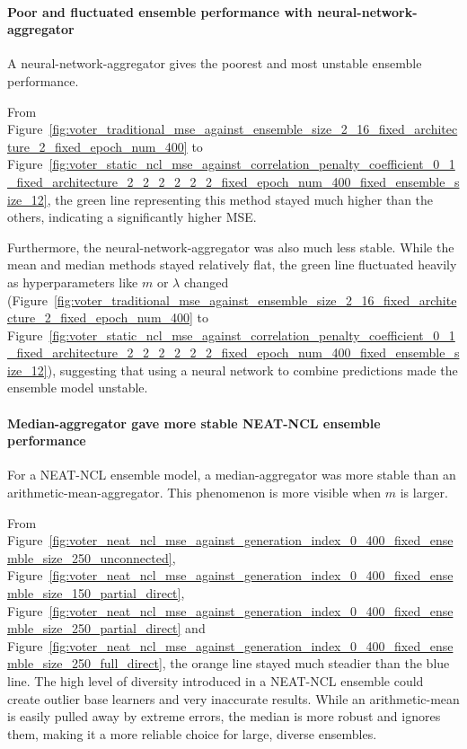 \paragraph{Poor and fluctuated ensemble performance with neural-network-aggregator}
A neural-network-aggregator gives the poorest and most unstable ensemble performance. 

From Figure~\ref{fig:voter_traditional_mse_against_ensemble_size_2_16_fixed_architecture_2_fixed_epoch_num_400} to Figure~\ref{fig:voter_static_ncl_mse_against_correlation_penalty_coefficient_0_1_fixed_architecture_2_2_2_2_2_2_fixed_epoch_num_400_fixed_ensemble_size_12}, the green line representing this method stayed much higher than the others, indicating a significantly higher MSE. 

Furthermore, the neural-network-aggregator was also much less stable. While the mean and median methods stayed relatively flat, the green line fluctuated heavily as hyperparameters like $m$ or $\lambda$ changed (Figure~\ref{fig:voter_traditional_mse_against_ensemble_size_2_16_fixed_architecture_2_fixed_epoch_num_400} to Figure~\ref{fig:voter_static_ncl_mse_against_correlation_penalty_coefficient_0_1_fixed_architecture_2_2_2_2_2_2_fixed_epoch_num_400_fixed_ensemble_size_12}), suggesting that using a neural network to combine predictions made the ensemble model unstable. 

\paragraph{Median-aggregator gave more stable NEAT-NCL ensemble performance}
For a NEAT-NCL ensemble model, a median-aggregator was more stable than an arithmetic-mean-aggregator. This phenomenon is more visible when $m$ is larger. 

From Figure~\ref{fig:voter_neat_ncl_mse_against_generation_index_0_400_fixed_ensemble_size_250_unconnected}, Figure~\ref{fig:voter_neat_ncl_mse_against_generation_index_0_400_fixed_ensemble_size_150_partial_direct}, Figure~\ref{fig:voter_neat_ncl_mse_against_generation_index_0_400_fixed_ensemble_size_250_partial_direct} and Figure~\ref{fig:voter_neat_ncl_mse_against_generation_index_0_400_fixed_ensemble_size_250_full_direct}, the orange line stayed much steadier than the blue line. The high level of diversity introduced in a NEAT-NCL ensemble could create outlier base learners and very inaccurate results. While an arithmetic-mean is easily pulled away by extreme errors, the median is more robust and ignores them, making it a more reliable choice for large, diverse ensembles. 


